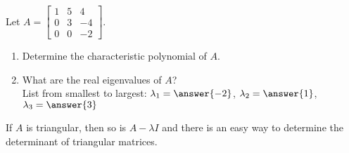 \documentclass{ximera}
\begin{document}
  	  		      \begin{question} Let $A= \begin{bmatrix} 1&5&4 \\0&3&-4\\ 0&0&-2\end{bmatrix}$.\\
  	  		      	
  	  		      	\begin{enumerate}
  	  		      		\item Determine the characteristic polynomial of $A$. \\
  	  		      		
  	  		      		\begin{multipleChoice}
  	  		      			\end{multipleChoice}
  	  		      		
  	  		      		\item What are the real eigenvalues of $A$?\\
  	  		      		
  	  		      		List from smallest to largest: $\lambda_1 = \answer{-2}$, $\lambda_2 = \answer{1}$, $\lambda_3 = \answer{3}$\\
  	  		      	\end{enumerate}
  	  		      	\begin{hint}
  	  		      		If $A$ is triangular, then so is $A-\lambda I$ and there is an easy way to determine the determinant of triangular matrices.
  	  		      		\end{hint}
  	  		      \end{question}	
\end{document}
